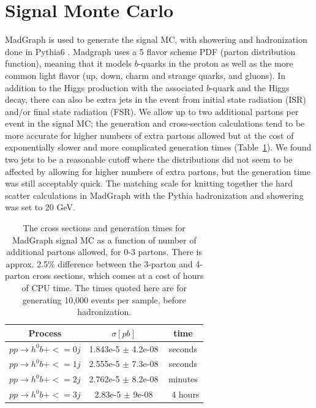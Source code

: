 \section{Signal Monte Carlo}
MadGraph \cite{MadGraph} is used to generate the signal MC, with showering and 
hadronization done in Pythia6 \cite{Pythia6}.  Madgraph uses a 5 flavor scheme PDF 
(parton distribution function), meaning that it models $b$-quarks in the proton as 
well as the more common light flavor (up, down, charm and strange quarks, 
and gluons).  In addition to the Higgs production with the associated $b$-quark and 
the Higgs decay, there can also be extra jets in the event from initial state radiation (ISR) 
and/or final state radiation (FSR).  We allow up to two additional partons per 
event in the signal MC; the generation and cross-section calculations tend to be more 
accurate for higher numbers of extra partons allowed but at the cost of exponentially slower and more 
complicated generation times (Table~\ref{tab:mg_times}).  We found two jets to be a reasonable cutoff where the distributions did 
not seem to be affected by allowing for higher numbers of extra partons, but the generation 
time was still acceptably quick.  The matching scale for knitting together the hard scatter
calculations in MadGraph with the Pythia hadronization and showering was set to 20 GeV.

\begin{table}
   \caption{The cross sections and generation times for MadGraph signal MC as a function
   of number of additional partons allowed, for 0-3 partons.  There is approx. 2.5\%
   difference between the 3-parton and 4-parton cross sections, which comes at a cost
   of hours of CPU time.  The times quoted here are for generating 10,000 events per 
   sample, before hadronization. \label{tab:mg_times}} 
    \center
    \begin{tabular}{ c c c } \hline\hline
    Process & $\sigma [pb]$ & time \\ \hline
    $pp\rightarrow h^0b + <=0j$ & 1.843e-5 $\pm$ 4.2e-08 & seconds \\
    $pp\rightarrow h^0b + <=1j$ & 2.555e-5 $\pm$ 7.3e-08 & seconds \\
    $pp\rightarrow h^0b + <=2j$ & 2.762e-5 $\pm$ 8.2e-08 & minutes \\
    $pp\rightarrow h^0b + <=3j$ & 2.83e-5 $\pm$ 9e-08 & $~$ 4 hours \\
    \end{tabular}
\end{table}

